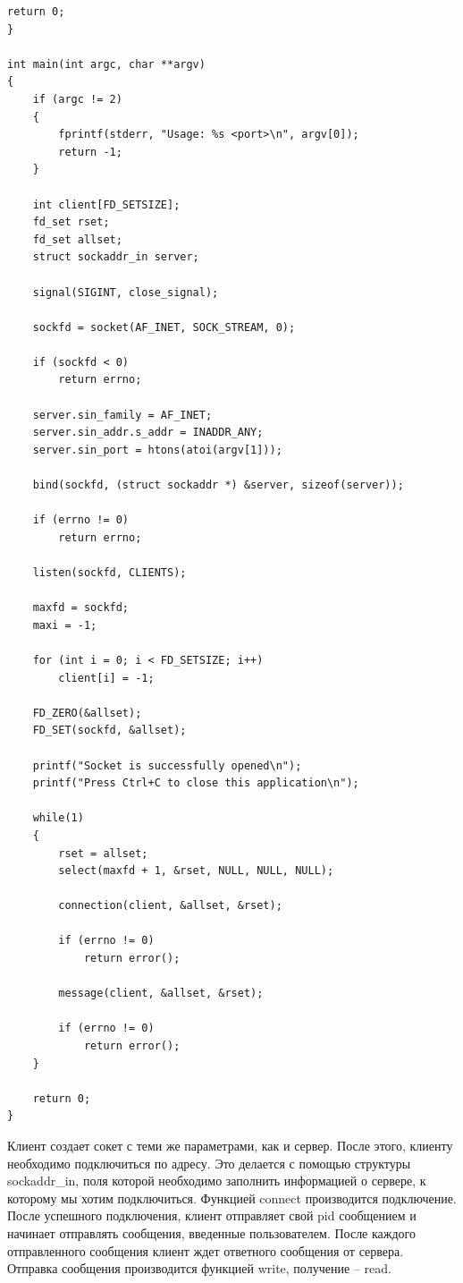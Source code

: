\begin{lstlisting}[caption=Текст программы сервера]
    return 0;
}

int main(int argc, char **argv)
{
    if (argc != 2)
    {
        fprintf(stderr, "Usage: %s <port>\n", argv[0]);
        return -1;
    }

    int client[FD_SETSIZE];
    fd_set rset;
    fd_set allset;
    struct sockaddr_in server;

    signal(SIGINT, close_signal);

    sockfd = socket(AF_INET, SOCK_STREAM, 0);

    if (sockfd < 0)
        return errno;

    server.sin_family = AF_INET;
    server.sin_addr.s_addr = INADDR_ANY;
    server.sin_port = htons(atoi(argv[1]));

    bind(sockfd, (struct sockaddr *) &server, sizeof(server));

    if (errno != 0)
        return errno;

    listen(sockfd, CLIENTS);

    maxfd = sockfd;
    maxi = -1;

    for (int i = 0; i < FD_SETSIZE; i++)
        client[i] = -1;

    FD_ZERO(&allset);
    FD_SET(sockfd, &allset);

    printf("Socket is successfully opened\n");
    printf("Press Ctrl+C to close this application\n");

    while(1)
    {
        rset = allset;
        select(maxfd + 1, &rset, NULL, NULL, NULL);

        connection(client, &allset, &rset);

        if (errno != 0)
            return error();

        message(client, &allset, &rset);

        if (errno != 0)
            return error();
    }

    return 0;
}
\end{lstlisting}

Клиент создает сокет с теми же параметрами, как и сервер. После этого, клиенту необходимо подключиться по адресу. Это делается с помощью структуры {\ttfamily sockaddr\_in}, поля которой необходимо заполнить информацией о сервере, к которому мы хотим подключиться. Функцией {\ttfamily connect} производится подключение. После успешного подключения, клиент отправляет свой pid сообщением и начинает отправлять сообщения, введенные пользователем. После каждого отправленного сообщения клиент ждет ответного сообщения от сервера. Отправка сообщения производится функцией {\ttfamily write}, получение -- {\ttfamily read}.

